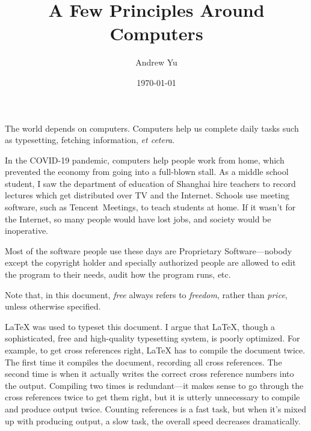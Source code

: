 \documentclass[twocolumn]{article}
\title{A Few Principles Around Computers}
\author{Andrew Yu}
\date{\today}
\newcommand{\etc}{\emph{et cetera}}
\begin{document}
\maketitle
The world depends on computers. Computers help us complete daily tasks such as typesetting, fetching information, \etc{}.

In the COVID-19 pandemic, computers help people work from home, which prevented the economy from going into a full-blown stall. As a middle school student, I saw the department of education of Shanghai hire teachers to record lectures which get distributed over TV and the Internet. Schools use meeting software, such as Tencent~Meetings, to teach students at home. If it wasn't for the Internet, so many people would have lost jobs, and society would be inoperative.

Most of the software people use these days are Proprietary Software---nobody except the copyright holder and specially authorized people are allowed to edit the program to their needs, audit how the program runs, etc.

Note that, in this document, \emph{free} always refers to \emph{freedom}, rather than \emph{price}, unless otherwise specified.

\LaTeX{} was used to typeset this document. I argue that \LaTeX, though a sophisticated, free and high-quality typesetting system, is poorly optimized. For example, to get cross references right, \LaTeX{} has to compile the document twice. The first time it compiles the document, recording all cross references. The second time is when it actually writes the correct cross reference numbers into the output. Compiling two times is redundant---it makes sense to go through the cross references twice to get them right, but it is utterly unnecessary to compile and produce output twice. Counting references is a fast task, but when it's mixed up with producing output, a slow task, the overall speed decreases dramatically.
\end{document}
